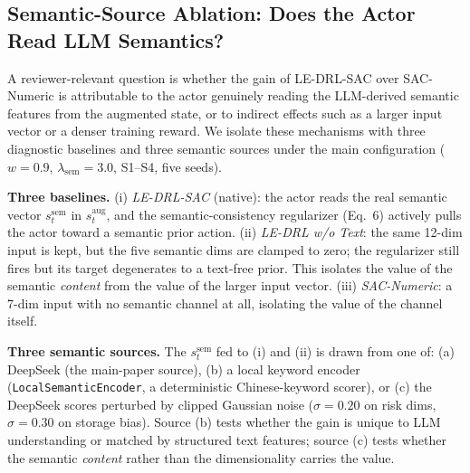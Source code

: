 
\subsection{Semantic-Source Ablation: Does the Actor Read LLM Semantics?}
\label{sec:m5_ablation}

A reviewer-relevant question is whether the gain of LE-DRL-SAC over SAC-Numeric is
attributable to the actor genuinely reading the LLM-derived semantic features from
the augmented state, or to indirect effects such as a larger input vector or a denser
training reward. We isolate these mechanisms with three diagnostic baselines and
three semantic sources under the main configuration ($w=0.9$, $\lambda_{\mathrm{sem}}=3.0$,
S1--S4, five seeds).

\textbf{Three baselines.} (i) \emph{LE-DRL-SAC} (native): the actor reads the real
semantic vector $s^{\mathrm{sem}}_t$ in $s^{\mathrm{aug}}_t$, and the semantic-consistency
regularizer (Eq.~6) actively pulls the actor toward a semantic prior action.
(ii) \emph{LE-DRL w/o Text}: the same 12-dim input is kept, but the five semantic
dims are clamped to zero; the regularizer still fires but its target degenerates to a
text-free prior. This isolates the value of the semantic \emph{content} from the value
of the larger input vector. (iii) \emph{SAC-Numeric}: a 7-dim input with no semantic
channel at all, isolating the value of the channel itself.

\textbf{Three semantic sources.} The $s^{\mathrm{sem}}_t$ fed to (i) and (ii) is drawn
from one of: (a) DeepSeek (the main-paper source), (b) a local keyword encoder
(\texttt{LocalSemanticEncoder}, a deterministic Chinese-keyword scorer), or (c) the
DeepSeek scores perturbed by clipped Gaussian noise ($\sigma{=}0.20$ on risk dims,
$\sigma{=}0.30$ on storage bias). Source (b) tests whether the gain is unique to LLM
understanding or matched by structured text features; source (c) tests whether the
semantic \emph{content} rather than the dimensionality carries the value.

